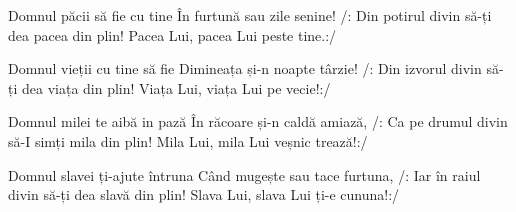 
\beginverse
Domnul păcii să fie cu tine
În furtună sau zile senine!
/: Din potirul divin să-ți dea pacea din plin!
Pacea Lui, pacea Lui peste tine.:/
\endverse

\beginverse
Domnul vieții cu tine să fie
Dimineața și-n noapte târzie!
/: Din izvorul divin să-ți dea viața din plin!
Viața Lui, viața Lui pe vecie!:/
\endverse

\beginverse
Domnul milei te aibă in pază
În răcoare și-n caldă amiază,
/: Ca pe drumul divin să-I simți mila din plin!
Mila Lui, mila Lui veșnic trează!:/
\endverse

\beginverse
Domnul slavei ți-ajute întruna
Când mugește sau tace furtuna,
/: Iar în raiul divin să-ți dea slavă din plin!
Slava Lui, slava Lui ți-e cununa!:/
\endverse

\endsong

